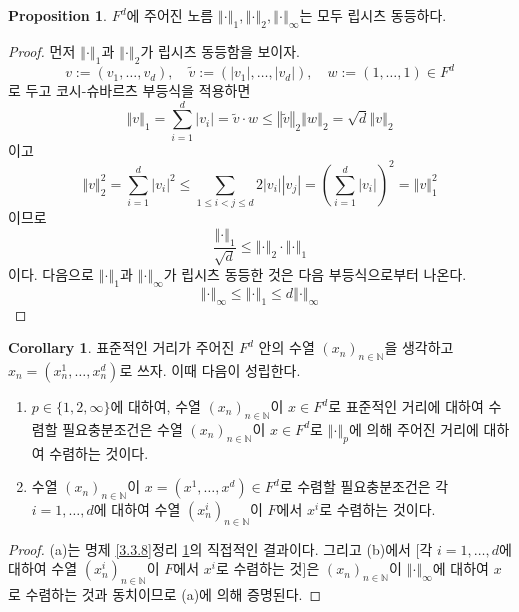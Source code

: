 \documentclass[11pt]{book}
\numberwithin{equation}{chapter}
\def\NN{\mathbb{N}}
\newcommand{\abs}[1]{\left\vert#1\right\vert}
\newcommand{\norm}[1]{\left\Vert#1\right\Vert}
\newcommand{\paren}[1]{\left(#1\right)}
\theoremstyle{definition}
\newtheorem{cor}[thm]{Corollary}
\newtheorem{prop}[thm]{Proposition}
\begin{document}
\begin{prop} \label{3.3.9}
    \(F^d\)에 주어진 노름 \(\norm{\cdot}_1, \norm{\cdot}_2, \norm{\cdot}_\infty\)는 모두 립시츠 동등하다.
\end{prop}
\begin{proof}
    먼저 \(\norm{\cdot}_1\)과 \(\norm{\cdot}_2\)가 립시츠 동등함을 보이자.
    \[
        v := (v_1, \ldots, v_d), \quad \tilde{v} := (\abs{v_1}, \ldots, \abs{v_d}), \quad w := (1, \ldots, 1) \in F^d
    \]
    로 두고 코시-슈바르츠 부등식을 적용하면
    \[
    \norm{v}_1 = \sum_{i=1}^d \abs{v_i} = \tilde{v} \cdot w \le \norm{\tilde{v}}_2 \norm{w}_2 = \sqrt{d} \norm{v}_2
    \]
    이고
    \[
        \norm{v}_2^2 = \sum_{i=1}^d \abs{v_i}^2 \le \sum_{1 \le i < j \le d} 2\abs{v_i}\abs{v_j} = \paren{\sum_{i=1}^d \abs{v_i}}^2 = \norm{v}_1^2
    \]
    이므로
    \[
        \frac{\norm{\cdot}_1}{\sqrt{d}} \le \norm{\cdot}_2 \cdot \norm{\cdot}_1
    \]
    이다. 다음으로 \(\norm{\cdot}_1\)과 \(\norm{\cdot}_\infty\)가 립시츠 동등한 것은 다음 부등식으로부터 나온다.
    \[
        \norm{\cdot}_\infty \le \norm{\cdot}_1 \le d \norm{\cdot}_\infty
    \]
\end{proof}

\begin{cor}
    표준적인 거리가 주어진 \(F^d\) 안의 수열 \((x_n)_{n \in \NN}\)을 생각하고 \(x_n = (x_n^1, \ldots, x_n^d)\)로 쓰자. 이때 다음이 성립한다. 
    \begin{enumerate}[label=(\alph*), leftmargin=2\parindent]
        \item \(p \in \{1, 2, \infty\}\)에 대하여, 수열 \((x_n)_{n \in \NN}\)이 \(x \in F^d\)로 표준적인 거리에 대하여 수렴할 필요충분조건은 수열 \((x_n)_{n \in \NN}\)이 \(x \in F^d\)로 \(\norm{\cdot}_p\)에 의해 주어진 거리에 대하여 수렴하는 것이다.
        \item 수열 \((x_n)_{n \in \NN}\)이 \(x = (x^1, \ldots, x^d) \in F^d\)로 수렴할 필요충분조건은 각 \(i = 1, \ldots, d\)에 대하여 수열 \((x_n^i)_{n \in \NN}\)이 \(F\)에서 \(x^i\)로 수렴하는 것이다.
    \end{enumerate}
\end{cor}
\begin{proof}
    (a)는 명제 \ref{3.3.8}\과 정리 \ref{3.3.9}의 직접적인 결과이다. 그리고 (b)에서 [각 \(i = 1, \ldots, d\)에 대하여 수열 \((x_n^i)_{n \in \NN}\)이 \(F\)에서 \(x^i\)로 수렴하는 것]은 \((x_n)_{n \in \NN}\)이 \(\norm{\cdot}_\infty\)에 대하여 \(x\)로 수렴하는 것과 동치이므로 (a)에 의해 증명된다.
\end{proof}
\end{document}

